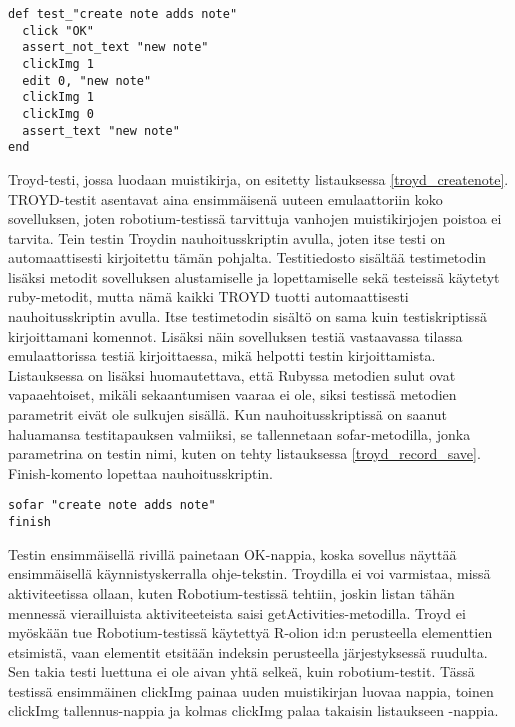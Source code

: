 \begin{lstlisting}[float, label=troyd_createnote,caption=Muistikirjan luontitesti Troydilla]
def test_"create note adds note"
  click "OK"
  assert_not_text "new note"
  clickImg 1
  edit 0, "new note"
  clickImg 1
  clickImg 0
  assert_text "new note"
end
\end{lstlisting}

Troyd-testi, jossa luodaan muistikirja, on esitetty listauksessa \ref{troyd_createnote}. TROYD-testit asentavat aina ensimmäisenä uuteen emulaattoriin koko sovelluksen, joten robotium-testissä tarvittuja vanhojen muistikirjojen poistoa ei tarvita. Tein testin Troydin nauhoitusskriptin avulla, joten itse testi on automaattisesti kirjoitettu tämän pohjalta. Testitiedosto sisältää testimetodin lisäksi metodit sovelluksen alustamiselle ja lopettamiselle sekä testeissä käytetyt ruby-metodit, mutta nämä kaikki TROYD tuotti automaattisesti nauhoitusskriptin avulla. Itse testimetodin sisältö on sama kuin testiskriptissä kirjoittamani komennot. Lisäksi näin sovelluksen testiä vastaavassa tilassa emulaattorissa testiä kirjoittaessa, mikä helpotti testin kirjoittamista. Listauksessa on lisäksi huomautettava, että Rubyssa metodien sulut ovat vapaaehtoiset, mikäli sekaantumisen vaaraa ei ole, siksi testissä metodien parametrit eivät ole sulkujen sisällä. Kun nauhoitusskriptissä on saanut haluamansa testitapauksen valmiiksi, se tallennetaan sofar-metodilla, jonka parametrina on testin nimi, kuten on tehty listauksessa \ref{troyd_record_save}. Finish-komento lopettaa nauhoitusskriptin.

\begin{lstlisting}[float, label=troyd_record_save,caption=Testin tallennus nauhoitusskriptistä Troydilla]
sofar "create note adds note"
finish
\end{lstlisting}

Testin ensimmäisellä rivillä painetaan OK-nappia, koska sovellus näyttää ensimmäisellä käynnistyskerralla ohje-tekstin. Troydilla ei voi varmistaa, missä aktiviteetissa ollaan, kuten Robotium-testissä tehtiin, joskin listan tähän mennessä vierailluista aktiviteeteista saisi getActivities-metodilla. Troyd ei myöskään tue Robotium-testissä käytettyä R-olion id:n perusteella elementtien etsimistä, vaan elementit etsitään indeksin perusteella järjestyksessä ruudulta. Sen takia testi luettuna ei ole aivan yhtä selkeä, kuin robotium-testit. Tässä testissä ensimmäinen clickImg painaa uuden muistikirjan luovaa nappia, toinen clickImg tallennus-nappia ja kolmas clickImg palaa takaisin listaukseen -nappia.

